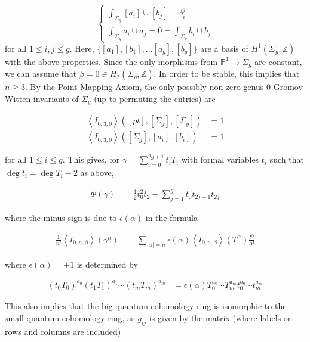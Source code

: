 \documentclass{amsart}
\newcommand{\PP}{\mathbb{P}}\newcommand{\A}{\mathbb{A}}\newcommand{\Z}{\mathbb{Z}}\newcommand{\C}{\mathbb{C}}\newcommand{\N}{\mathbb{N}}\newcommand{\T}{\mathbb{T}}
\begin{document}
\[ \begin{cases} \int_{\Sigma_g} [a_i] \cup [b_j] = \delta_i^j\\ \int_{\Sigma_g} a_i \cup a_j = 0 = \int_{\Sigma_g} b_i\cup b_j  \end{cases}  \] for all $1 \leq i,j \leq g$. Here, $\{[a_1],[b_1],\dots [a_g],[b_g]\}$ are a basis of $H^1(\Sigma_g, \Z)$ with the above properties. Since the only morphisms from $\PP^1 \rightarrow \Sigma_g$ are constant, we can assume that $\beta = 0 \in H_2(\Sigma_g, \Z)$. In order to be stable, this implies that $n\geq 3$. By the Point Mapping Axiom, the only possibly non-zero genus 0 Gromov-Witten invariants of $\Sigma_g$ (up to permuting the entries) are 

\begin{align*}
\left<I_{0,3,0}\right>\left( [pt],[\Sigma_g],[\Sigma_g] \right) &= 1\\
\left<I_{0,3,0}\right> \left( [\Sigma_g], [a_i],[b_i] \right) &= 1
\end{align*} 

for all $1\leq i \leq g$. This gives, for $\gamma = \sum_{i=0}^{2g+1}t_iT_i$ with formal variables $t_i$ such that $\deg t_i = \deg T_i-2$ as above,

\begin{align*}
    \Phi(\gamma) &= \frac{1}{2}t_0^2 t_2 - \sum_{j=1}^g t_0 t_{2j-1} t_{2j}
\end{align*}

where the minus sign is due to $\epsilon(\alpha)$ in the formula

\begin{align*}
    \frac{1}{n!} \left< I_{0,n,\beta} \right> (\gamma^n) &= \sum_{|\alpha|=n} \epsilon(\alpha) \left<I_{0,n,\beta} \right> (T^\alpha) \frac{t^\alpha}{\alpha!} \end{align*}

where $\epsilon(\alpha)=\pm 1$ is determined by 

\begin{align*}
        (t_0T_0)^{a_0}(t_1T_1)^{a_1} \cdots (t_mT_m)^{a_m} &= \epsilon(\alpha) T_0^{a_0}\cdots T_m^{a_m}t_0^{a_0} \cdots t_m^{a_m} 
    \end{align*}


This also implies that the big quantum cohomology ring is isomorphic to the small quantum cohomology ring, as $g_{ij}$ is given by the matrix (where labels on rows and columns are included)
\end{document}
